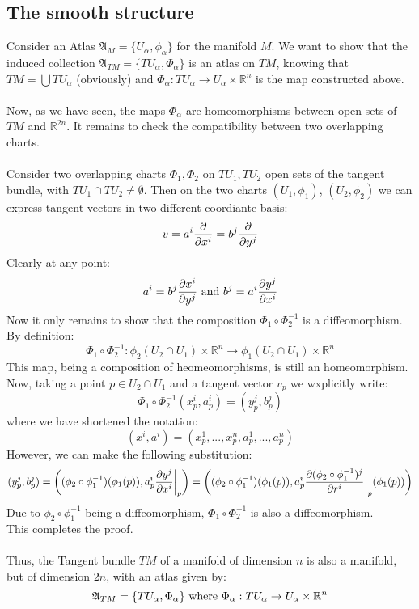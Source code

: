 \documentclass[12pt,a4paper]{report}
\theoremstyle{definition}
\theoremstyle{Theorem}
\theoremstyle{definition}
\theoremstyle{definition}
\theoremstyle{definition}
\begin{document}
		\subsection{The smooth structure}
		Consider an Atlas $\mathfrak{A}_M=\{U_\alpha,\phi_\alpha\}$ for the manifold $M$. We want to show that the induced collection $\mathfrak{A}_{TM}=\{TU_\alpha,\Phi_\alpha\}$ is an atlas on $TM$, knowing that $TM=\bigcup TU_\alpha$ (obviously) and $\Phi_\alpha:TU_\alpha\rightarrow U_\alpha\times \mathbb{R}^n$ is the map constructed above.\\
		\\
		Now, as we have seen, the maps $\Phi_\alpha$ are homeomorphisms between open sets of $TM$ and $\mathbb{R}^{2n}$. It remains to check the compatibility between two overlapping charts.\\
		\\
		Consider two overlapping charts $\Phi_1,\Phi_2$ on $TU_1,TU_2$ open sets of the tangent bundle, with $TU_1\cap TU_2\neq \emptyset$. Then on the two charts $(U_1,\phi_1)$, $(U_2,\phi_2)$ we can express tangent vectors in two different coordiante basis:
		$$v=a^i{\partial\over \partial{x^i}}=b^j{\partial \over \partial y^j}$$
		Clearly at any point:
		$$a^i=b^j{\partial x^i\over\partial y^j} \hbox{ and } b^j=a^i{\partial y^j\over\partial x^i}$$
		Now it only remains to show that the composition $\Phi_1\circ \Phi_2^{-1}$ is a diffeomorphism.\\
		By definition:
		$$\Phi_1\circ \Phi_2^{-1}:\phi_2(U_2\cap U_1)\times \mathbb{R}^n\rightarrow \phi_1(U_2\cap U_1)\times \mathbb{R}^n$$
		This map, being a composition of heomeomorphisms, is still an homeomorphism. Now, taking a point $p\in U_2\cap U_1$ and a tangent vector $v_p$ we wxplicitly write:
		$$\Phi_1\circ \Phi_2^{-1}(x^i_p,a^i_p)=(y^j_p,b^j_p)$$
		where we have shortened the notation:
		$$(x^i,a^i)=(x^1_p,...,x^n_p,a^1_p,...,a^n_p)$$
		However, we can make the following substitution:
		$$(y^j_p,b^j_p)=\bigg((\phi_2\circ \phi_1^{-1})(\phi_1(p)),a^i_p{\partial y^j\over\partial x^i}\bigg|_p\bigg)=\bigg((\phi_2\circ \phi_1^{-1})(\phi_1(p)),a^i_p{\partial (\phi_2\circ \phi_1^{-1})^j\over\partial r^i}\bigg|_p(\phi_1(p))\bigg)$$
		Due to $\phi_2\circ \phi_1^{-1}$ being a diffeomorphism, $\Phi_1\circ \Phi_2^{-1}$ is also a diffeomorphism.\\
		This completes the proof.\\
		\\
		Thus, the Tangent bundle $TM$ of a manifold of dimension $n$ is also a manifold, but of dimension $2n$, with an atlas given by:
		$$\mathfrak{A}_{TM}=\{TU_\alpha,\Phi_\alpha\} \hbox{ where } \Phi_\alpha:TU_\alpha\rightarrow U_\alpha\times \mathbb{R}^n$$
\end{document}
